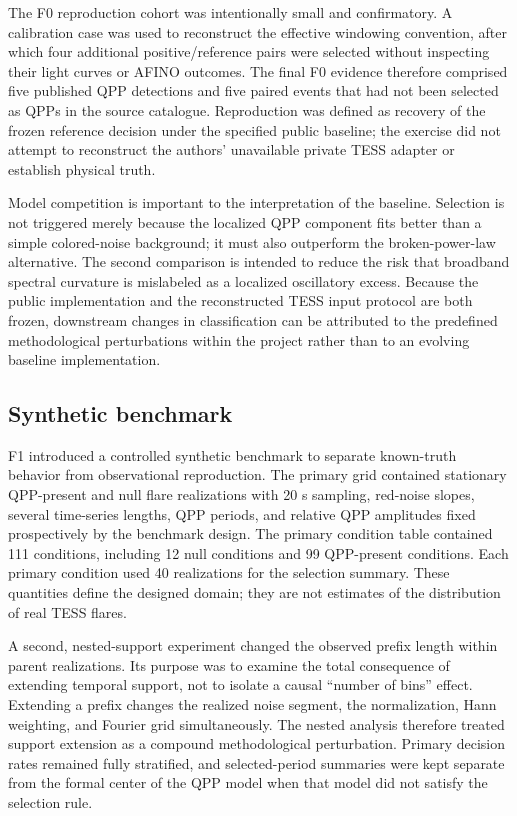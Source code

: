\documentclass[manuscript,linenumbers]{aastex702}
\begin{document}
The F0 reproduction cohort was intentionally small and confirmatory. A calibration case was used to reconstruct the effective windowing convention, after which four additional positive/reference pairs were selected without inspecting their light curves or AFINO outcomes. The final F0 evidence therefore comprised five published QPP detections and five paired events that had not been selected as QPPs in the source catalogue. Reproduction was defined as recovery of the frozen reference decision under the specified public baseline; the exercise did not attempt to reconstruct the authors' unavailable private TESS adapter or establish physical truth.

Model competition is important to the interpretation of the baseline. Selection is not triggered merely because the localized QPP component fits better than a simple colored-noise background; it must also outperform the broken-power-law alternative. The second comparison is intended to reduce the risk that broadband spectral curvature is mislabeled as a localized oscillatory excess. Because the public implementation and the reconstructed TESS input protocol are both frozen, downstream changes in classification can be attributed to the predefined methodological perturbations within the project rather than to an evolving baseline implementation.

\subsection{Synthetic benchmark}
F1 introduced a controlled synthetic benchmark to separate known-truth behavior from observational reproduction. The primary grid contained stationary QPP-present and null flare realizations with 20 s sampling, red-noise slopes, several time-series lengths, QPP periods, and relative QPP amplitudes fixed prospectively by the benchmark design. The primary condition table contained 111 conditions, including 12 null conditions and 99 QPP-present conditions. Each primary condition used 40 realizations for the selection summary. These quantities define the designed domain; they are not estimates of the distribution of real TESS flares.

A second, nested-support experiment changed the observed prefix length within parent realizations. Its purpose was to examine the total consequence of extending temporal support, not to isolate a causal ``number of bins'' effect. Extending a prefix changes the realized noise segment, the normalization, Hann weighting, and Fourier grid simultaneously. The nested analysis therefore treated support extension as a compound methodological perturbation. Primary decision rates remained fully stratified, and selected-period summaries were kept separate from the formal center of the QPP model when that model did not satisfy the selection rule.
\end{document}
